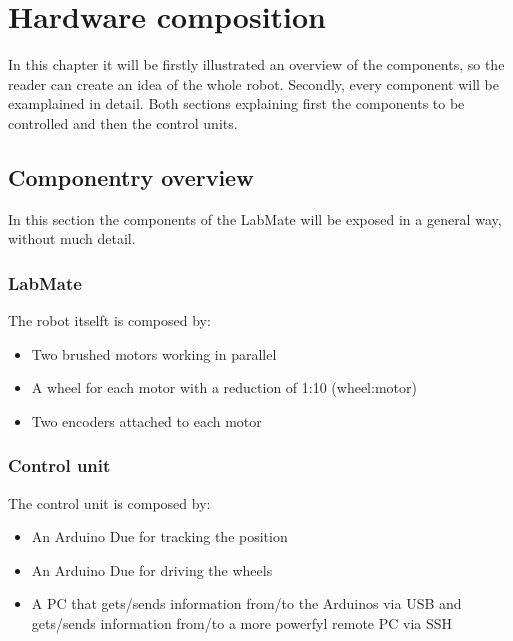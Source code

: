 \chapter{Hardware composition}
In this chapter it will be firstly illustrated an overview of the components, so the reader can create an idea of the whole robot. 
Secondly, every component will be examplained in detail. Both sections explaining first the components to be controlled and then the control units. 

\section{Componentry overview}
In this section the components of the LabMate will be exposed in a general way, without much detail.

\subsection{LabMate}
The robot itselft is composed by:
\begin{itemize}
    \item Two brushed motors working in parallel
    \item A wheel for each motor with a reduction of 1:10 (wheel:motor)
    \item Two encoders attached to each motor
\end{itemize}


\subsection{Control unit}
The control unit is composed by:
\begin{itemize}
    \item An Arduino Due for tracking the position
    \item An Arduino Due for driving the wheels
    \item A PC that gets/sends information from/to the Arduinos via USB and gets/sends information from/to a more powerfyl remote PC via SSH
\end{itemize}

